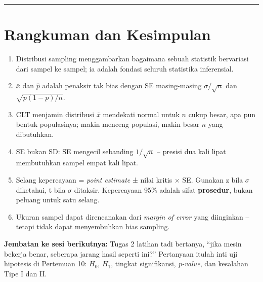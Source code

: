 \documentclass[
  indonesian,
  letterpaper,
]{book}
\providecommand{\tightlist}{%
  \setlength{\itemsep}{0pt}\setlength{\parskip}{0pt}}
\begin{document}
\begin{center}\rule{0.5\linewidth}{0.5pt}\end{center}

\section{Rangkuman dan Kesimpulan}\label{rangkuman-dan-kesimpulan}

\begin{enumerate}
\def\labelenumi{\arabic{enumi}.}
\tightlist
\item
  Distribusi sampling menggambarkan bagaimana sebuah statistik
  bervariasi dari sampel ke sampel; ia adalah fondasi seluruh statistika
  inferensial.
\item
  \(\bar{x}\) dan \(\hat{p}\) adalah penaksir tak bias dengan SE
  masing-masing \(\sigma/\sqrt{n}\) dan \(\sqrt{p(1-p)/n}\).
\item
  CLT menjamin distribusi \(\bar{x}\) mendekati normal untuk \(n\) cukup
  besar, apa pun bentuk populasinya; makin menceng populasi, makin besar
  \(n\) yang dibutuhkan.
\item
  SE bukan SD: SE mengecil sebanding \(1/\sqrt{n}\) -- presisi dua kali
  lipat membutuhkan sampel empat kali lipat.
\item
  Selang kepercayaan = \emph{point estimate} ± nilai kritis × SE.
  Gunakan z bila \(\sigma\) diketahui, t bila \(\sigma\) ditaksir.
  Kepercayaan 95\% adalah sifat \textbf{prosedur}, bukan peluang untuk
  satu selang.
\item
  Ukuran sampel dapat direncanakan dari \emph{margin of error} yang
  diinginkan -- tetapi tidak dapat menyembuhkan bias sampling.
\end{enumerate}

\begin{tcolorbox}[enhanced jigsaw, arc=.35mm, bottomrule=.15mm, bottomtitle=1mm, breakable, colback=white, colbacktitle=quarto-callout-note-color!10!white, colframe=quarto-callout-note-color-frame, coltitle=black, left=2mm, leftrule=.75mm, opacityback=0, opacitybacktitle=0.6, rightrule=.15mm, title=\textcolor{quarto-callout-note-color}{\faInfo}\hspace{0.5em}{Catatan}, titlerule=0mm, toprule=.15mm, toptitle=1mm]

\textbf{Jembatan ke sesi berikutnya:} Tugas 2 latihan tadi bertanya,
``jika mesin bekerja benar, seberapa jarang hasil seperti ini?''
Pertanyaan itulah inti uji hipotesis di Pertemuan 10: \(H_0\), \(H_1\),
tingkat signifikansi, \emph{p-value}, dan kesalahan Tipe I dan II.

\end{tcolorbox}
\end{document}
